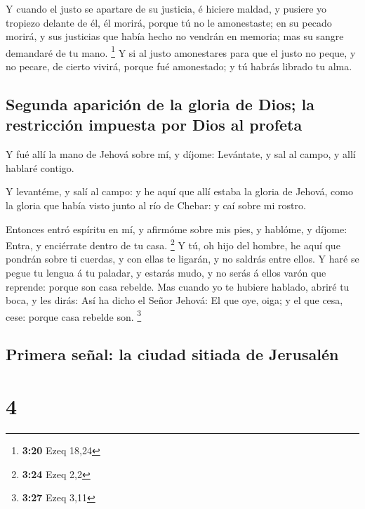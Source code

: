  Y cuando el justo se apartare de su justicia, é hiciere
maldad, y pusiere yo tropiezo delante de él, él morirá, porque tú no le
amonestaste; en su pecado morirá, y sus justicias que había hecho no
vendrán en memoria; mas su sangre demandaré de tu mano. \footnote{\textbf{3:20}
  Ezeq 18,24}  Y si al justo amonestares para que el justo
no peque, y no pecare, de cierto vivirá, porque fué amonestado; y tú
habrás librado tu alma.

\hypertarget{segunda-apariciuxf3n-de-la-gloria-de-dios-la-restricciuxf3n-impuesta-por-dios-al-profeta}{%
\subsection{Segunda aparición de la gloria de Dios; la restricción
impuesta por Dios al
profeta}\label{segunda-apariciuxf3n-de-la-gloria-de-dios-la-restricciuxf3n-impuesta-por-dios-al-profeta}}

 Y fué allí la mano de Jehová sobre mí, y díjome:
Levántate, y sal al campo, y allí hablaré contigo.

 Y levantéme, y salí al campo: y he aquí que allí estaba la
gloria de Jehová, como la gloria que había visto junto al río de Chebar:
y caí sobre mi rostro.

 Entonces entró espíritu en mí, y afirmóme sobre mis pies,
y hablóme, y díjome: Entra, y enciérrate dentro de tu casa. \footnote{\textbf{3:24}
  Ezeq 2,2}  Y tú, oh hijo del hombre, he aquí que pondrán
sobre ti cuerdas, y con ellas te ligarán, y no saldrás entre ellos.
 Y haré se pegue tu lengua á tu paladar, y estarás mudo, y
no serás á ellos varón que reprende: porque son casa rebelde.
 Mas cuando yo te hubiere hablado, abriré tu boca, y les
dirás: Así ha dicho el Señor Jehová: El que oye, oiga; y el que cesa,
cese: porque casa rebelde son. \footnote{\textbf{3:27} Ezeq 3,11}

\hypertarget{primera-seuxf1al-la-ciudad-sitiada-de-jerusaluxe9n}{%
\subsection{Primera señal: la ciudad sitiada de
Jerusalén}\label{primera-seuxf1al-la-ciudad-sitiada-de-jerusaluxe9n}}

\hypertarget{section-3}{%
\section{4}\label{section-3}}

